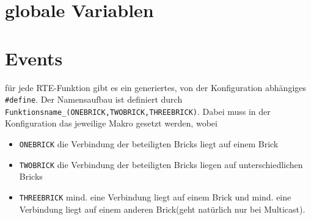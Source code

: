 \documentclass[a4paper,11pt]{scrreprt}
\begin{document}
\section{globale Variablen}
\section{Events} 
für jede RTE-Funktion gibt es ein generiertes, von der Konfiguration abhängiges \lstinline|#define|. Der Namensaufbau ist definiert durch
\lstinline|Funktionsname_(ONEBRICK,TWOBRICK,THREEBRICK)|. Dabei muss in der Konfiguration das jeweilige Makro gesetzt werden, wobei
\begin{itemize}
\item \lstinline|ONEBRICK| die Verbindung der beteiligten Bricks liegt auf einem Brick
\item \lstinline|TWOBRICK| die Verbindung der beteiligten Bricks liegen auf unterschiedlichen Bricks
\item \lstinline|THREEBRICK| mind. eine Verbindung liegt auf einem Brick und mind. eine Verbindung liegt auf einem anderen Brick(geht natürlich nur bei Multicast).
\end{itemize}
\end{document}
